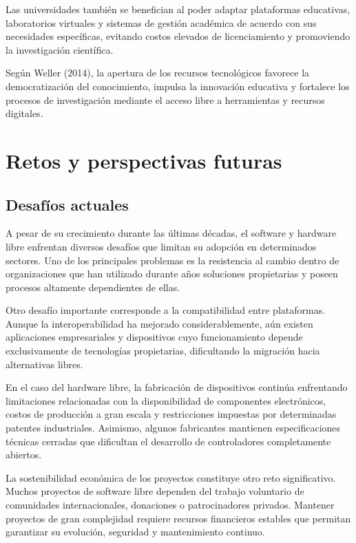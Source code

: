 \documentclass[12pt]{article}
\begin{document}
	Las universidades también se benefician al poder adaptar plataformas educativas, laboratorios virtuales y sistemas de gestión académica de acuerdo con sus necesidades específicas, evitando costos elevados de licenciamiento y promoviendo la investigación científica.
	
	Según Weller (2014), la apertura de los recursos tecnológicos favorece la democratización del conocimiento, impulsa la innovación educativa y fortalece los procesos de investigación mediante el acceso libre a herramientas y recursos digitales.
	
	\section{Retos y perspectivas futuras}
	\subsection{Desafíos actuales}

	A pesar de su crecimiento durante las últimas décadas, el software y hardware libre enfrentan diversos desafíos que limitan su adopción en determinados sectores. Uno de los principales problemas es la resistencia al cambio dentro de organizaciones que han utilizado durante años soluciones propietarias y poseen procesos altamente dependientes de ellas.
	
	Otro desafío importante corresponde a la compatibilidad entre plataformas. Aunque la interoperabilidad ha mejorado considerablemente, aún existen aplicaciones empresariales y dispositivos cuyo funcionamiento depende exclusivamente de tecnologías propietarias, dificultando la migración hacia alternativas libres.
	
	En el caso del hardware libre, la fabricación de dispositivos continúa enfrentando limitaciones relacionadas con la disponibilidad de componentes electrónicos, costos de producción a gran escala y restricciones impuestas por determinadas patentes industriales.
	Asimismo, algunos fabricantes mantienen especificaciones técnicas cerradas que dificultan el desarrollo de controladores completamente abiertos.
	
	La sostenibilidad económica de los proyectos constituye otro reto significativo. Muchos proyectos de software libre dependen del trabajo voluntario de comunidades internacionales, donaciones o patrocinadores privados. Mantener proyectos de gran complejidad requiere recursos financieros estables que permitan garantizar su evolución, seguridad y mantenimiento continuo.
	
\end{document}
